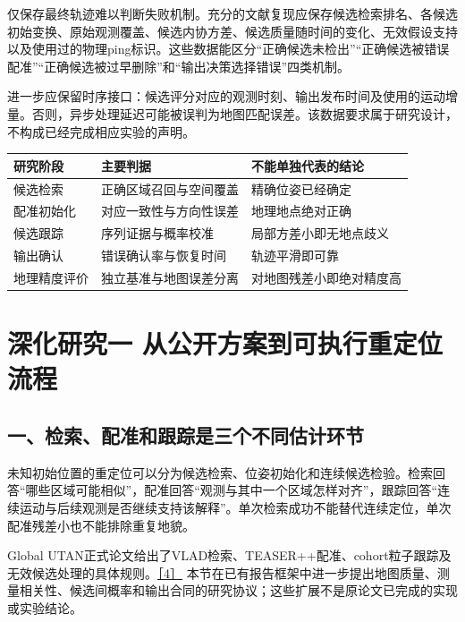 仅保存最终轨迹难以判断失败机制。充分的文献复现应保存候选检索排名、各候选初始变换、原始观测覆盖、候选内协方差、候选质量随时间的变化、无效假设支持以及使用过的物理ping标识。这些数据能区分``正确候选未检出''``正确候选被错误配准''``正确候选被过早删除''和``输出决策选择错误''四类机制。

进一步应保留时序接口：候选评分对应的观测时刻、输出发布时间及使用的运动增量。否则，异步处理延迟可能被误判为地图匹配误差。该数据要求属于研究设计，不构成已经完成相应实验的声明。

\begin{longtable}[]{@{}lll@{}}
\toprule
研究阶段 & 主要判据 & 不能单独代表的结论\tabularnewline
\midrule
\endhead
候选检索 & 正确区域召回与空间覆盖 & 精确位姿已经确定\tabularnewline
配准初始化 & 对应一致性与方向性误差 & 地理地点绝对正确\tabularnewline
候选跟踪 & 序列证据与概率校准 & 局部方差小即无地点歧义\tabularnewline
输出确认 & 错误确认率与恢复时间 & 轨迹平滑即可靠\tabularnewline
地理精度评价 & 独立基准与地图误差分离 & 对地图残差小即绝对精度高\tabularnewline
\bottomrule
\end{longtable}

\hypertarget{ux6df1ux5316ux7814ux7a76ux4e00-ux4eceux516cux5f00ux65b9ux6848ux5230ux53efux6267ux884cux91cdux5b9aux4f4dux6d41ux7a0b}{%
\section{深化研究一 从公开方案到可执行重定位流程}\label{ux6df1ux5316ux7814ux7a76ux4e00-ux4eceux516cux5f00ux65b9ux6848ux5230ux53efux6267ux884cux91cdux5b9aux4f4dux6d41ux7a0b}}

\hypertarget{ux4e00ux68c0ux7d22ux914dux51c6ux548cux8ddfux8e2aux662fux4e09ux4e2aux4e0dux540cux4f30ux8ba1ux73afux8282}{%
\subsection{一、检索、配准和跟踪是三个不同估计环节}\label{ux4e00ux68c0ux7d22ux914dux51c6ux548cux8ddfux8e2aux662fux4e09ux4e2aux4e0dux540cux4f30ux8ba1ux73afux8282}}

未知初始位置的重定位可以分为候选检索、位姿初始化和连续候选检验。检索回答``哪些区域可能相似''，配准回答``观测与其中一个区域怎样对齐''，跟踪回答``连续运动与后续观测是否继续支持该解释''。单次检索成功不能替代连续定位，单次配准残差小也不能排除重复地貌。

Global UTAN正式论文给出了VLAD检索、TEASER++配准、cohort粒子跟踪及无效候选处理的具体规则。\href{https://doi.org/10.1109/TIM.2026.3716492}{［4］} 本节在已有报告框架中进一步提出地图质量、测量相关性、候选间概率和输出合同的研究协议；这些扩展不是原论文已完成的实现或实验结论。

